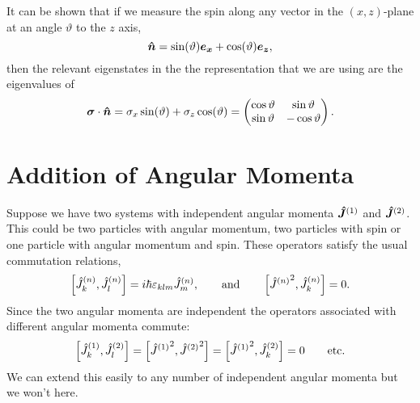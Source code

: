 \documentclass[a4paper]{article}
\newcommand{\vecoperator}[1]{\vv{\operator{#1}}}
\newcommand{\angmomsquared}[1]{{\tensor{\operator{J}}{^{(#1)}}}^2}
\theoremstyle{definition}
\begin{document}
    It can be shown that if we measure the spin along any vector in the \((x, z)\)-plane at an angle \(\vartheta\) to the \(z\) axis,
    \[\bm{\hat{n}} = \sin(\vartheta)\bm{e_{x}} + \cos(\vartheta)\bm{e_{z}},\]
    then the relevant eigenstates in the the representation that we are using are the eigenvalues of
    \[
        \bm{\sigma}\cdot\bm{\hat{n}} = \sigma_x\sin(\vartheta) + \sigma_z\cos(\vartheta) = 
        \begin{pmatrix}
            \cos\vartheta & \sin\vartheta\\
            \sin\vartheta & -\cos\vartheta
        \end{pmatrix}
        .
    \]
    
    \section{Addition of Angular Momenta}\label{sec:addition of angular momenta}
    Suppose we have two systems with independent angular momenta \(\vecoperator{J}^{(1)}\) and \(\vecoperator{J}^{(2)}\).
    This could be two particles with angular momentum, two particles with spin or one particle with angular momentum and spin.
    These operators satisfy the usual commutation relations,
    \[\left[\operator{J}^{(n)}_k, \operator{J}^{(n)}_l\right] = i\hbar\varepsilon_{klm}\operator{J}^{(n)}_m, \qquad\text{and}\qquad \left[\angmomsquared{n}, \operator{J}^{(n)}_k\right] = 0.\]
    Since the two angular momenta are independent the operators associated with different angular momenta commute:
    \[\left[\operator{J}^{(1)}_k, \operator{J}^{(2)}_l\right] = \left[\angmomsquared{1}, \angmomsquared{2}\right] = \left[\angmomsquared{1}, \operator{J}^{(2)}_k\right] = 0 \qquad\text{etc.}\]
    We can extend this easily to any number of independent angular momenta but we won't here.
    
\end{document}
